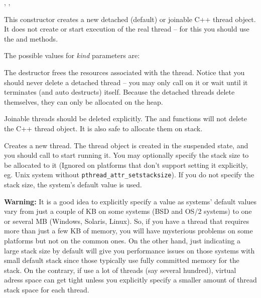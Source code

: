 , , 



\label{wxthreadctor}


This constructor creates a new detached (default) or joinable C++ thread object. It
does not create or start execution of the real thread -- for this you should
use the  and  methods.

The possible values for {\it kind} parameters are:

\twocolwidtha{7cm}
\begin{twocollist}\itemsep=0pt
\end{twocollist}


\label{wxthreaddtor}


The destructor frees the resources associated with the thread. Notice that you
should never delete a detached thread -- you may only call
 on it or wait until it terminates (and auto
destructs) itself. Because the detached threads delete themselves, they can
only be allocated on the heap.

Joinable threads should be deleted explicitly. The  and  functions
will not delete the C++ thread object. It is also safe to allocate them on
stack.


\label{wxthreadcreate}


Creates a new thread. The thread object is created in the suspended state, and you
should call  to start running it.  You may optionally
specify the stack size to be allocated to it (Ignored on platforms that don't
support setting it explicitly, eg. Unix system without
\texttt{pthread\_attr\_setstacksize}). If you do not specify the stack size,
the system's default value is used.

{\bf Warning:} It is a good idea to explicitly specify a value as systems'
default values vary from just a couple of KB on some systems (BSD and
OS/2 systems) to one or several MB (Windows, Solaris, Linux). So, if you
have a thread that requires more than just a few KB of memory, you will
have mysterious problems on some platforms but not on the common ones. On the
other hand, just indicating a large stack size by default will give you
performance issues on those systems with small default stack since those
typically use fully committed memory for the stack. On the contrary, if
use a lot of threads (say several hundred), virtual adress space can get tight
unless you explicitly specify a smaller amount of thread stack space for each
thread.



